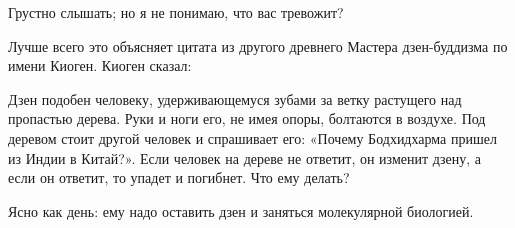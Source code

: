 \documentclass[../main.tex]{subfiles}
\begin{document}
\begin{dialogue}
 Грустно слышать; но я не понимаю, что вас тревожит?

 Лучше всего это объясняет цитата из другого древнего Мастера дзен-буддизма по имени Киоген. Киоген сказал:

\begin{koan}
    Дзен подобен человеку, удерживающемуся зубами за ветку растущего над пропастью дерева. Руки и ноги его, не имея опоры, болтаются в воздухе. Под деревом стоит другой человек и спрашивает его: «Почему Бодхидхарма пришел из Индии в Китай?». Если человек на дереве не ответит, он изменит дзену, а если он ответит, то упадет и погибнет. Что ему делать?
\end{koan}

 {\raggedright Ясно как день: ему надо оставить дзен и заняться молекулярной биологией.\par}

\end{dialogue}

\endgroup
\end{document}
